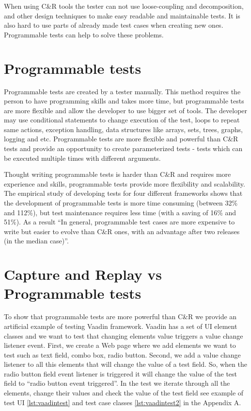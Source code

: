  When using C\&R tools the tester can
not use loose-coupling and decomposition, and other design techniques to make
easy readable and maintainable tests. It is also hard to use parts of already
made test cases when creating new ones. Programmable tests can help to solve these problems.

\section{Programmable tests} 
\label{sec:programTests}
Programmable tests are created by a tester manually. This method requires the
person to have programming skills and takes more time, but programmable tests
are more flexible and allow the developer to use bigger set of tools. The
developer may use conditional statements to change execution of the test,
loops to repeat same actions, exception handling, data structures like
arrays, sets, trees, graphs, logging and etc. Programmable tests are more
flexible and powerful than C\&R tests and provide an opportunity to create
parameterized tests - tests which can be executed multiple times with different arguments. 

Thought writing programmable tests is harder than C\&R and requires more
 experience and skills, programmable tests provide more flexibility and scalability. The empirical study
       of developing tests for four different frameworks shows that the development of programmable tests is more time
      consuming (between 32\% and 112\%), but test maintenance requires less
      time (with a saving of 16\% and 51\%). As a result ``In general, programmable test cases are more
      expensive to write but easier to evolve than C\&R ones, with an advantage
      after two releases (in the median case)''.\cite{CaptureReplay7}

 \section{Capture and Replay vs Programmable tests}
 To show that programmable tests are more powerful than C\&R we provide an
artificial example of testing Vaadin framework.	
Vaadin has a set of UI element classes and we want to	test that changing 
elements value triggers a value change listener event.
First, we create a Web page where we add elements we
want to test such as text field, combo box, radio button. Second, we add a value
change listener to all this elements that will change the value of a test field.
So, when the radio button field event listener is triggered it will change the
value of the test field to ``radio button event triggered''. In the test we
iterate through all the elements, change their values and check the value
of the test field see example of test UI \ref{lst:vaadintest} and test case
classes \ref{lst:vaadintest2} in the Appendix A.

